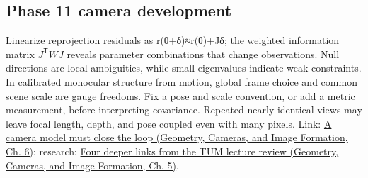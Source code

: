 \subsection{Phase 11 camera development}\label{appendix-3ee9861904d5-phase-11-camera-development}

\hypertarget{appendix-3ee9861904d5-phase-11-camera-development}{}

Linearize reprojection residuals as r(θ+δ)≈r(θ)+Jδ; the weighted information matrix \(J^{\mathsf T}WJ\) reveals parameter combinations that change observations. Null directions are local ambiguities, while small eigenvalues indicate weak constraints. In calibrated monocular structure from motion, global frame choice and common scene scale are gauge freedoms. Fix a pose and scale convention, or add a metric measurement, before interpreting covariance. Repeated nearly identical views may leave focal length, depth, and pose coupled even with many pixels. Link: \href{../03-Geometry-Cameras-and-Image-Formation/main.pdf\#nameddest=02-foundations-ii-ch037-a-camera-model-must-close-the-loop}{A camera model must close the loop (Geometry, Cameras, and Image Formation, Ch. 6)}; research: \href{../03-Geometry-Cameras-and-Image-Formation/main.pdf\#nameddest=02-foundations-ii-ch036-four-deeper-links-from-the-tum-lecture-review}{Four deeper links from the TUM lecture review (Geometry, Cameras, and Image Formation, Ch. 5)}.
